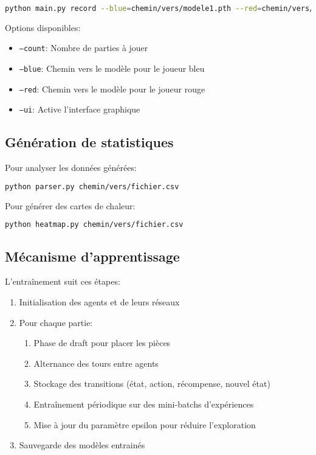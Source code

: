 \documentclass[]{article}
\begin{document}
\begin{lstlisting}[language=bash]
python main.py record --blue=chemin/vers/modele1.pth --red=chemin/vers/modele2.pth --count=100
\end{lstlisting}

Options disponibles:
\begin{itemize}
  \item \texttt{--count}: Nombre de parties à jouer
  \item \texttt{--blue}: Chemin vers le modèle pour le joueur bleu
  \item \texttt{--red}: Chemin vers le modèle pour le joueur rouge
  \item \texttt{--ui}: Active l'interface graphique
\end{itemize}

\subsection{Génération de statistiques}
Pour analyser les données générées:

\begin{lstlisting}[language=bash]
python parser.py chemin/vers/fichier.csv
\end{lstlisting}

Pour générer des cartes de chaleur:

\begin{lstlisting}[language=bash]
python heatmap.py chemin/vers/fichier.csv
\end{lstlisting}

\subsection{Mécanisme d'apprentissage}
L'entraînement suit ces étapes:

\begin{enumerate}
  \item Initialisation des agents et de leurs réseaux
  \item Pour chaque partie:
    \begin{enumerate}
      \item Phase de draft pour placer les pièces
      \item Alternance des tours entre agents
      \item Stockage des transitions (état, action, récompense, nouvel état)
      \item Entraînement périodique sur des mini-batchs d'expériences
      \item Mise à jour du paramètre epsilon pour réduire l'exploration
    \end{enumerate}
  \item Sauvegarde des modèles entrainés
\end{enumerate}
\end{document}
